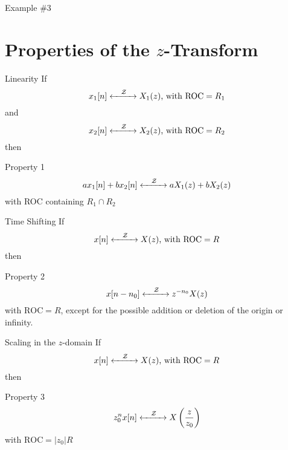 \documentclass[aspectratio=169]{beamer}
\newcommand{\Cross}{$\mathbin{\tikz [x=1.4ex,y=1.4ex,line width=.2ex] \draw (0,0) -- (1,1) (0,1) -- (1,0);}$}%
\begin{document}
\begin{frame}{Example \#3}
{\begin{figure}[h!]
	\end{figure}
}
\end{frame}



\section{Properties of the $ z $-Transform}
\begin{frame}{Linearity}
	If\\
	 \[x_1[n] \xleftrightarrow[]{\quad\mathcal{Z}\quad} X_1(z) \text{, with } \mathrm{ROC} =R_1\]
	and\\
	\[ x_2[n] \xleftrightarrow[]{\quad\mathcal{Z}\quad} X_2(z) \text{, with   } \mathrm{ROC} =R_2 \]
	then
	\begin{block}{Property 1}
		\[ ax_1[n]+bx_2[n] \xleftrightarrow[]{\quad\mathcal{Z}\quad} aX_1(z)+bX_2(z)\]  
		\centering
		with ROC containing  $ R_1\cap R_2 $ 
	\end{block}
\end{frame}

\begin{frame}{Time Shifting}
	If\\
	\[x[n] \xleftrightarrow[]{\quad\mathcal{Z}\quad} X(z) \text{, with } \mathrm{ROC} =R\]
	then
	\begin{block}{Property 2}
		\[ x[n-n_0] \xleftrightarrow[]{\quad\mathcal{Z}\quad} z^{-n_0}X(z) \]
		\centering
		 with $\mathrm{ROC} = R $, except for the possible addition or deletion of the origin or infinity.
	\end{block}
\end{frame}

\begin{frame}{Scaling in the $ z $-domain}
	If\\
	\[x[n] \xleftrightarrow[]{\quad\mathcal{Z}\quad} X(z) \text{, with } \mathrm{ROC} =R\]
	then
	\begin{block}{Property 3}
		\[ z_0^nx[n] \xleftrightarrow[]{\quad\mathcal{Z}\quad} X\left(\frac{z}{z_0}\right) \]
		\centering
		with $\mathrm{ROC} = |z_0|R $
	\end{block}
\end{frame}
\end{document}
